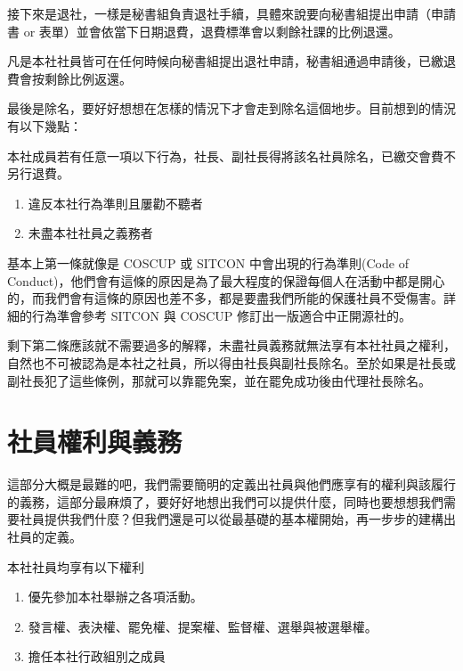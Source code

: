 \documentclass[12pt, a4paper]{NGPLB}
\begin{document}
接下來是退社，一樣是秘書組負責退社手續，具體來說要向秘書組提出申請（申請書 or 表單）並會依當下日期退費，退費標準會以剩餘社課的比例退還。


\begin{mylisting}
\item 凡是本社社員皆可在任何時候向秘書組提出退社申請，秘書組通過申請後，已繳退費會按剩餘比例返還。
\end{mylisting}


最後是除名，要好好想想在怎樣的情況下才會走到除名這個地步。目前想到的情況有以下幾點：


\begin{mylisting}
\item 本社成員若有任意一項以下行為，社長、副社長得將該名社員除名，已繳交會費不另行退費。
\begin{enumerate}
\item 違反本社行為準則且屢勸不聽者
\item 未盡本社社員之義務者
\end{enumerate}
\end{mylisting}


基本上第一條就像是 COSCUP 或 SITCON 中會出現的行為準則(Code of Conduct)，他們會有這條的原因是為了最大程度的保證每個人在活動中都是開心的，而我們會有這條的原因也差不多，都是要盡我們所能的保護社員不受傷害。詳細的行為準會參考 SITCON 與 COSCUP 修訂出一版適合中正開源社的。

剩下第二條應該就不需要過多的解釋，未盡社員義務就無法享有本社社員之權利，自然也不可被認為是本社之社員，所以得由社長與副社長除名。至於如果是社長或副社長犯了這些條例，那就可以靠罷免案，並在罷免成功後由代理社長除名。

\section{社員權利與義務}

這部分大概是最難的吧，我們需要簡明的定義出社員與他們應享有的權利與該履行的義務，這部分最麻煩了，要好好地想出我們可以提供什麼，同時也要想想我們需要社員提供我們什麼？但我們還是可以從最基礎的基本權開始，再一步步的建構出社員的定義。


\begin{mylisting}
\item 本社社員均享有以下權利
\begin{enumerate}
\item 優先參加本社舉辦之各項活動。
\item 發言權、表決權、罷免權、提案權、監督權、選舉與被選舉權。
\item 擔任本社行政組別之成員
\end{enumerate}
\end{mylisting}
\end{document}
